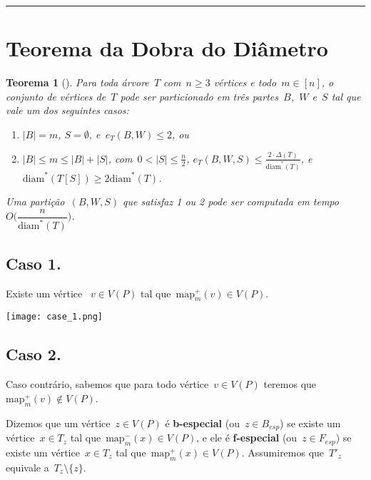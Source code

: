 \documentclass[a0,portrait]{a0poster}
\newtheorem{teo}{Teorema}
\newcommand{\diam}{\mathrm{diam}}
\newcommand{\map}{\mathrm{map}}
\begin{document}
\begin{multicols}{3}
\noindent\rule[0.5ex]{\linewidth}{1pt}



\section*{Teorema da Dobra do Diâmetro}

\begin{teo}[]
    Para toda árvore~$T$ com~${n\ge 3}$ vértices e 
    todo~${m\in [n]}$,
    o conjunto de vértices de~$T$ pode ser particionado em 
    três partes~$B$,~$W$ e~$S$ tal que vale um dos 
    seguintes casos:
    \begin{enumerate}
    \item ${|B|=m}$, ${S=\emptyset}$, e~${e_T(B,W)\le 2}$, ou
    \item ${|B|\le m\le |B|+|S|}$, 
    com~${0<|S|\le\frac{n}{2}}$,
    ${e_T(B,W,S)\le \frac{2\cdot 
    \Delta(T)}{\diam^*(T)}}$, 
    e~${\diam^*(T[S])\ge 2\diam^*(T)}$.
    \end{enumerate}
    Uma partição~$(B,W,S)$ que satisfaz 1 ou 2 pode ser
    computada em tempo~${O\Big(\dfrac{n}{\diam^*(T)}\Big)}$.
\end{teo}


\subsection*{Caso 1.}
    Existe um vértice ~${v\in V(P)}$ tal 
    que~${\map_m^+(v)\in V(P)}$.
\begin{center}
\texttt{[image: case\_1.png]}
\end{center}

\subsection*{Caso 2.}
    Caso contrário, sabemos que para todo vértice~${v\in V(P)}$
    teremos que~${\map_m^+(v)\not\in V(P)}$.

    Dizemos que um vértice~${z\in V(P)}$ é \textbf{b-especial}
    (ou~${z\in B_{esp}}$)
    se existe um vértice~${x\in T_z}$ tal 
    que~${\map^{-}_m(x)\in V(P)}$, e ele é
    \textbf{f-especial} (ou~${z\in F_{esp}}$) 
    se existe um vértice~${x\in T_z}$
    tal que~${\map^{+}_m(x)\in V(P)}$.
    Assumiremos que~$T'_z$ equivale a~$T_z\setminus \{z\}$.


\end{multicols}
\end{document}
